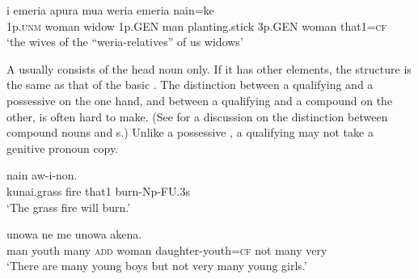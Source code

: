 \ea%
\label{ex:x411}
\gll i  emeria  apura    mua  weria   emeria  nain=ke\\
  1p.\textsc{unm}  woman  widow  1p.GEN  man  planting.stick  3p.GEN  woman  that1=\textsc{cf}  \\
\glt`the wives of the ``weria-relatives'' of us widows'
\z









A  usually consists of the head noun only. If it has other elements, the structure is the same as that of the basic . The distinction between a qualifying  and a possessive  on the one hand, and between a qualifying  and a  compound on the other, is often hard to make. (See   for a discussion on the distinction between compound nouns and s.) Unlike a possessive , a qualifying  may not take a genitive pronoun copy. 

\ea%
\label{ex:x413}
\gll {}    nain  aw-i-non. \\
    kunai.grass  fire  that1  burn-Np-FU.3s  \\
\glt`The grass fire will burn.'
\z





\ea%
\label{ex:x412}
\gll {}    unowa  ne   \textstyleEmphasizedVernacularWords{=} me  unowa  akena.\\
  man  youth  many  \textsc{add}  woman  daughter-youth=\textsc{cf} not  many  very     \\
\glt`There are many young boys but not very many young girls.'
\z









